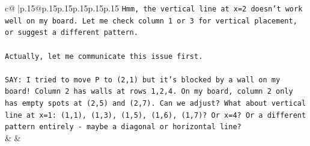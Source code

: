 \documentclass{article}
\begin{document}
{\begin{supertabular}{c@{$\;$}|p{.15\linewidth}@{}p{.15\linewidth}p{.15\linewidth}p{.15\linewidth}p{.15\linewidth}p{.15\linewidth}}
{{{\texttt{Hmm, the vertical line at x=2 doesn't work well on my board. Let me check column 1 or 3 for vertical placement, or suggest a different pattern.} \\
\\ 
\texttt{Actually, let me communicate this issue first.} \\
\\ 
\texttt{SAY: I tried to move P to (2,1) but it's blocked by a wall on my board! Column 2 has walls at rows 1,2,4. On my board, column 2 only has empty spots at (2,5) and (2,7). Can we adjust? What about vertical line at x=1: (1,1), (1,3), (1,5), (1,6), (1,7)? Or x=4? Or a different pattern entirely {-} maybe a diagonal or horizontal line?} \\
            }
        }
    }
    & & \\ \\


\end{supertabular}}
\end{document}
